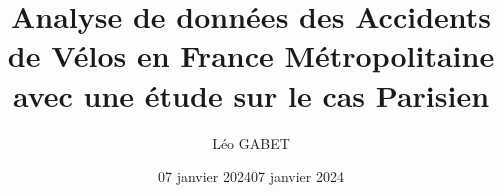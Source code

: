 \documentclass[french,]{compterendu}
\title{Analyse de données des Accidents de Vélos en France Métropolitaine avec une étude sur le cas Parisien}
\author{Léo GABET}
\date{07 janvier 2024}
\date{07 janvier 2024}
\theoremstyle{urcastyle}
\theoremstyle{remark}
\begin{document}

\newtheorem{lemme}{Lemme}[section]
\newtheorem{theoreme}{Théorème}[section]
\newtheorem{corollaire}{Corollaire}[section]
\newtheorem{propriete}{Propriété}[section]
\newtheorem{proprietes}{Propriétés}[section]



\maketitle

% 
% 
\end{document}
